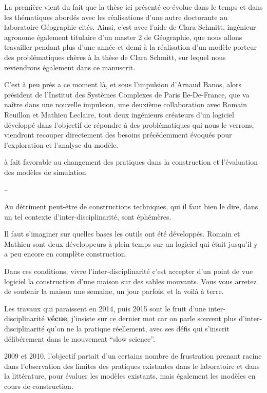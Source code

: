 La première vient du fait que la thèse ici présenté co-évolue dans le temps et dans les thématiques abordés avec les réalisations d'une autre doctorante au laboratoire Géographie-cités. Ainsi, c'est avec l'aide de Clara Schmitt, ingénieur agronome également titulaire d'un master 2 de Géographie, que nous allons travailler pendant plus d'une année et demi à la réalisation d'un modèle porteur des problématiques chères à la thèse de Clara Schmitt, sur lequel nous reviendrons également dans ce manuscrit.

C'est à peu près a ce moment là, et sous l'impulsion d'Arnaud Banos, alors président de l'Institut des Systèmes Complexes de Paris Ile-De-France, que va naître dans une nouvelle impulsion, une deuxième collaboration avec Romain Reuillon et Mathieu Leclaire, tout deux ingénieurs créateurs d'un logiciel développé dans l'objectif de répondre à des problématiques qui nous le verrons, viendront recouper directement des besoins précédemment évoqués pour l'exploration et l'analyse du modèle.


à fait favorable au changement des pratiques dans la construction et l'évaluation des modèles de simulation


--

Au détriment peut-être de constructions techniques, qui il faut bien le dire, dans un tel contexte d'inter-disciplinarité, sont éphémères.

Il faut s'imaginer sur quelles bases les outils ont été développés. Romain et Mathieu sont deux développeurs à plein temps sur un logiciel qui était jusqu'il y a peu encore en complète construction.

Dans ces conditions, vivre l'inter-disciplinarité c'est accepter d'un point de vue logiciel la construction d'une maison sur des sables mouvants. Vous vous arretez de soutenir la maison une semaine, un jour parfois, et la voilà à terre.

Les travaux qui paraissent en 2014, puis 2015 sont le fruit d'une inter-disciplinarité \textbf{vécue}, j'insiste sur ce dernier mot car on parle souvent plus d'inter-disciplinarité qu'on ne la pratique réellement, avec ses défis \autocite{Chapron2014} qui s'inscrit délibérement dans le mouvement \enquote{slow science}.


 2009 et 2010, l'objectif partait d'un certains nombre de frustration prenant racine  dans l'observation des limites des pratiques existantes dans le laboratoire et dans la littérature, pour évaluer les modèles existants, mais également les modèles en cours de construction.

